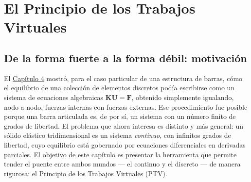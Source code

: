 \chapter{El Principio de los Trabajos Virtuales}
\label{cap:cap05-ptv}

\section{De la forma fuerte a la forma débil: motivación}
\label{sec:cap05-forma-fuerte-debil}

El \hyperref[cap:cap04-analisis-matricial-barras]{Capítulo 4} mostró, para el caso particular de una estructura de barras, cómo el equilibrio de una colección de elementos discretos podía escribirse como un sistema de ecuaciones algebraicas $\mathbf{K}\mathbf{U}=\mathbf{F}$, obtenido simplemente igualando, nodo a nodo, fuerzas internas con fuerzas externas. Ese procedimiento fue posible porque una barra articulada es, de por sí, un sistema con un número finito de grados de libertad. El problema que ahora interesa es distinto y más general: un sólido elástico tridimensional es un sistema \emph{continuo}, con infinitos grados de libertad, cuyo equilibrio está gobernado por ecuaciones diferenciales en derivadas parciales. El objetivo de este capítulo es presentar la herramienta que permite tender el puente entre ambos mundos --- el continuo y el discreto --- de manera rigurosa: el Principio de los Trabajos Virtuales (PTV).

